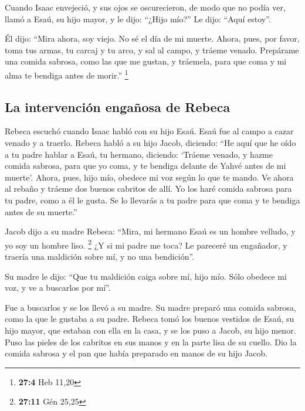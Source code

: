 \begin{paracol}{2}
 Cuando Isaac envejeció, y sus ojos se oscurecieron, de
modo que no podía ver, llamó a Esaú, su hijo mayor, y le dijo: ``¿Hijo
mío?'' Le dijo: ``Aquí estoy''.

 Él dijo: ``Mira ahora, soy viejo. No sé el día de mi
muerte.  Ahora, pues, por favor, toma tus armas, tu carcaj
y tu arco, y sal al campo, y tráeme venado.  Prepárame una
comida sabrosa, como las que me gustan, y tráemela, para que coma y mi
alma te bendiga antes de morir.'' \footnote{\textbf{27:4} Heb 11,20}

\hypertarget{la-intervenciuxf3n-engauxf1osa-de-rebeca}{%
\subsection{La intervención engañosa de
Rebeca}\label{la-intervenciuxf3n-engauxf1osa-de-rebeca}}

 Rebeca escuchó cuando Isaac habló con su hijo Esaú. Esaú
fue al campo a cazar venado y a traerlo.  Rebeca habló a
su hijo Jacob, diciendo: ``He aquí que he oído a tu padre hablar a Esaú,
tu hermano, diciendo:  `Tráeme venado, y hazme comida
sabrosa, para que yo coma, y te bendiga delante de Yahvé antes de mi
muerte'.  Ahora, pues, hijo mío, obedece mi voz según lo
que te mando.  Ve ahora al rebaño y tráeme dos buenos
cabritos de allí. Yo los haré comida sabrosa para tu padre, como a él le
gusta.  Se lo llevarás a tu padre para que coma y te
bendiga antes de su muerte.''

 Jacob dijo a su madre Rebeca: ``Mira, mi hermano Esaú es
un hombre velludo, y yo soy un hombre liso. \footnote{\textbf{27:11} Gén
  25,25}  ¿Y si mi padre me toca? Le pareceré un
engañador, y traería una maldición sobre mí, y no una bendición''.

 Su madre le dijo: ``Que tu maldición caiga sobre mí,
hijo mío. Sólo obedece mi voz, y ve a buscarlos por mí''.

 Fue a buscarlos y se los llevó a su madre. Su madre
preparó una comida sabrosa, como la que le gustaba a su padre.
 Rebeca tomó los buenos vestidos de Esaú, su hijo mayor,
que estaban con ella en la casa, y se los puso a Jacob, su hijo menor.
 Puso las pieles de los cabritos en sus manos y en la
parte lisa de su cuello.  Dio la comida sabrosa y el pan
que había preparado en manos de su hijo Jacob.


\end{paracol}
